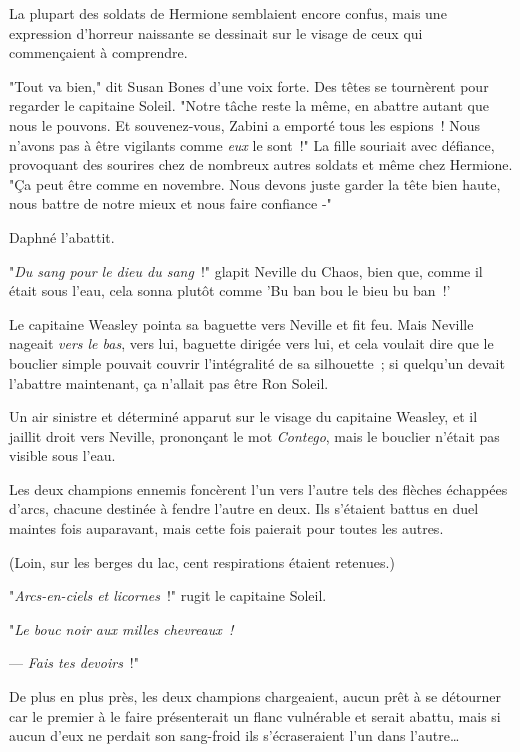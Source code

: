 La plupart des soldats de Hermione semblaient encore confus, mais une expression d'horreur naissante se dessinait sur le visage de ceux qui commençaient à comprendre.

"Tout va bien," dit Susan Bones d'une voix forte. Des têtes se tournèrent pour regarder le capitaine Soleil. "Notre tâche reste la même, en abattre autant que nous le pouvons. Et souvenez-vous, Zabini a emporté tous les espions~! Nous n'avons pas à être vigilants comme \emph{eux} le sont~!" La fille souriait avec défiance, provoquant des sourires chez de nombreux autres soldats et même chez Hermione. "Ça peut être comme en novembre. Nous devons juste garder la tête bien haute, nous battre de notre mieux et nous faire confiance -"

Daphné l'abattit.

\later

"\emph{Du sang pour le dieu du sang}~!" glapit Neville du Chaos, bien que, comme il était sous l'eau, cela sonna plutôt comme 'Bu ban bou le bieu bu ban~!'

Le capitaine Weasley pointa sa baguette vers Neville et fit feu. Mais Neville nageait \emph{vers le bas}, vers lui, baguette dirigée vers lui, et cela voulait dire que le bouclier simple pouvait couvrir l'intégralité de sa silhouette~; si quelqu'un devait l'abattre maintenant, ça n'allait pas être Ron Soleil.

Un air sinistre et déterminé apparut sur le visage du capitaine Weasley, et il jaillit droit vers Neville, prononçant le mot \emph{Contego}, mais le bouclier n'était pas visible sous l'eau.

Les deux champions ennemis foncèrent l'un vers l'autre tels des flèches échappées d'arcs, chacune destinée à fendre l'autre en deux. Ils s'étaient battus en duel maintes fois auparavant, mais cette fois paierait pour toutes les autres.

(Loin, sur les berges du lac, cent respirations étaient retenues.)

"\emph{Arcs-en-ciels et licornes}~!" rugit le capitaine Soleil.

"\emph{Le bouc noir aux milles chevreaux~!}

--- \emph{Fais tes devoirs}~!"

De plus en plus près, les deux champions chargeaient, aucun prêt à se détourner car le premier à le faire présenterait un flanc vulnérable et serait abattu, mais si aucun d'eux ne perdait son sang-froid ils s'écraseraient l'un dans l'autre…

